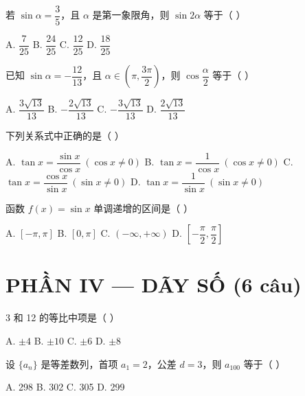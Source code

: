 \documentclass[11pt, a4paper]{article}
\begin{document}
\begin{baitap}[18]
若 $\sin\alpha=\dfrac{3}{5}$，且 $\alpha$ 是第一象限角，则 $\sin 2\alpha$ 等于（ ）
\par\vspace{3pt}
\noindent A. $\dfrac{7}{25}$ \quad B. $\dfrac{24}{25}$ \quad C. $\dfrac{12}{25}$ \quad D. $\dfrac{18}{25}$
\end{baitap}

\begin{baitap}[19]
已知 $\sin\alpha=-\dfrac{12}{13}$，且 $\alpha\in\left(\pi,\dfrac{3\pi}{2}\right)$，则 $\cos\dfrac{\alpha}{2}$ 等于（ ）
\par\vspace{3pt}
\noindent A. $\dfrac{3\sqrt{13}}{13}$ \quad B. $-\dfrac{2\sqrt{13}}{13}$ \quad C. $-\dfrac{3\sqrt{13}}{13}$ \quad D. $\dfrac{2\sqrt{13}}{13}$
\end{baitap}

\begin{baitap}[20]
下列关系式中正确的是（ ）
\par\vspace{3pt}
\noindent A. $\tan x=\dfrac{\sin x}{\cos x}\ (\cos x\ne0)$ \quad B. $\tan x=\dfrac{1}{\cos x}\ (\cos x\ne0)$ \quad C. $\tan x=\dfrac{\cos x}{\sin x}\ (\sin x\ne0)$ \quad D. $\tan x=\dfrac{1}{\sin x}\ (\sin x\ne0)$
\end{baitap}

\begin{baitap}[21]
函数 $f(x)=\sin x$ 单调递增的区间是（ ）
\par\vspace{3pt}
\noindent A. $[-\pi,\pi]$ \quad B. $[0,\pi]$ \quad C. $(-\infty,+\infty)$ \quad D. $\left[-\dfrac{\pi}{2},\dfrac{\pi}{2}\right]$
\end{baitap}

\section{PHẦN IV — DÃY SỐ (6 câu)}

\begin{baitap}[22]
3 和 12 的等比中项是（ ）
\par\vspace{3pt}
\noindent A. $\pm4$ \quad B. $\pm10$ \quad C. $\pm6$ \quad D. $\pm8$
\end{baitap}

\begin{baitap}[23]
设 $\{a_n\}$ 是等差数列，首项 $a_1=2$，公差 $d=3$，则 $a_{100}$ 等于（ ）
\par\vspace{3pt}
\noindent A. 298 \quad B. 302 \quad C. 305 \quad D. 299
\end{baitap}
\end{document}
